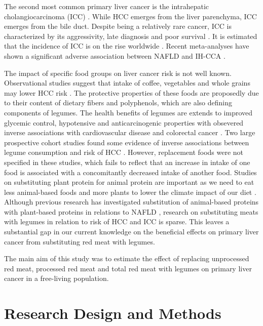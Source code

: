 \documentclass[sn-basic,Numbered,iicol,pdflatex]{sn-jnl}
\begin{document}
The second most common primary liver cancer is the intrahepatic
cholangiocarcinoma (ICC) \citep{Khan2019}. While HCC emerges from the liver
parenchyma, ICC emerges from the bile duct. Despite being a relatively
rare cancer, ICC is characterized by its aggressivity, late diagnosis
and poor survival \citep{kirstein2016}. It is estimated that the incidence of
ICC is on the rise worldwide \citep{Bergquist2015}. Recent meta-analyses have
shown a significant adverse association between NAFLD and IH-CCA
\citep{Wongjarupong2017, corrao2020}.

The impact of specific food groups on liver cancer risk is not well
known. Observational studies suggest that intake of coffee, vegetables
and whole grains may lower HCC risk \citep{zhang2013, yang2014, Liu2021, Bhurwal2020}. The protective properties of these foods are proposedly
due to their content of dietary fibers and polyphenols, which are also
defining components of legumes. The health benefits of legumes are
extends to improved glycemic control, hypotensive and anticarcinogenic
properties with obsevered inverse associations with cardiovascular
disease and colorectal cancer \citep{viguiliouk2019, jin2022}. Two large
prospective cohort studies found some evidence of inverse associations
between legume consumption and risk of HCC \citep{zhang2013, Liu2021}.
However, replacement foods were not specified in these studies, which
fails to reflect that an increase in intake of one food is associated
with a concomitantly decreased intake of another food. Studies on
substituting plant protein for animal protein are important as we need
to eat less animal-based foods and more plants to lower the climate
impact of our diet \citep{RN71}. Although previous research has investigated
substitution of animal-based proteins with plant-based proteins in
relations to NAFLD \citep{Zhang2023}, research on substituting meats with
legumes in relation to risk of HCC and ICC is sparse. This leaves a
substantial gap in our current knowledge on the beneficial effects on
primary liver cancer from substituting red meat with legumes.

The main aim of this study was to estimate the effect of replacing
unprocessed red meat, processed red meat and total red meat with legumes
on primary liver cancer in a free-living population.

\hypertarget{sec2}{%
\section{Research Design and Methods}\label{sec2}}
\end{document}
